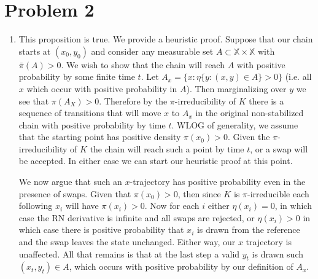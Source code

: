 \documentclass{article}
\begin{document}
\FloatBarrier
\newpage
\section{Problem 2}
\begin{enumerate}
    \item %
    This proposition is true. We provide a heuristic proof. Suppose that our
    chain starts at $(x_0, y_0)$ and consider any measurable set
    $A \subset \mathbb X \times \mathbb X$ with $\bar \pi (A) > 0$.
    We wish to show that the chain will reach $A$ with positive probability by
    some finite time $t$.
    Let $A_x  = \{ x : \eta\{ y: (x,y) \in A\} > 0 \}$
    (i.e. all $x$ which occur with positive probability in $A$). Then marginalizing over 
    $y$ we see that $\pi(A_X) > 0$. Therefore by the $\pi$-irreducibility of
    $K$ there is a sequence of transitions that will move $x$ to $A_x$ in the
    original non-stabilized chain with positive probability by time $t$. WLOG of generality, we assume that the
    starting point has positive density $\pi(x_0) > 0$. Given the $\pi$-irreducibility
    of $K$ the chain will reach such a point by time $t$, or a swap will be
    accepted. In either case we can start our heuristic proof at this point.

    We now argue that such an $x$-trajectory has positive probability even in
    the presence of swaps. Given that
    $\pi(x_0) > 0$, then since $K$ is $\pi$-irreducible each following $x_i$
    will have $\pi(x_i) > 0$. Now for each $i$ either $\eta(x_i) = 0$, in which case the RN
    derivative is infinite and all swaps are rejected, or $\eta(x_i) > 0$ in
    which case there is positive probability that $x_i$ is drawn from the
    reference and the swap leaves the state unchanged. Either way, our $x$
    trajectory is unaffected. All that remains is that at the last step a valid
    $y_t$ is drawn such $(x_t, y_t) \in A$, which occurs with positive probability
    by our definition of $A_x$.

    


\end{enumerate}
\end{document}
